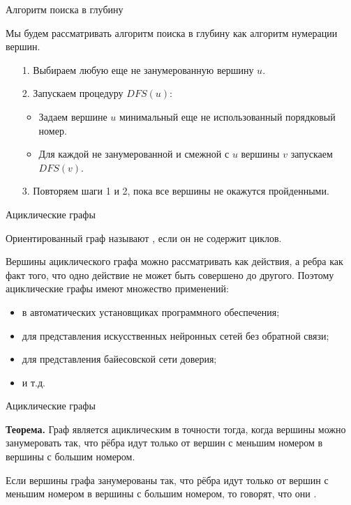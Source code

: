 \begin{frame}{Алгоритм поиска в глубину}

Мы будем рассматривать алгоритм поиска в глубину как алгоритм нумерации вершин.

\begin{itemize}
\item[1.] Выбираем любую еще не занумерованную вершину $u$.
\item[2.] Запускаем процедуру $DFS(u)$:
\begin{itemize}
\item Задаем вершине $u$ минимальный еще не использованный порядковый номер.
\item Для каждой не занумерованной и смежной с $u$ вершины $v$ запускаем $DFS(v)$.
\end{itemize}

\item[3.] Повторяем шаги 1 и 2, пока все вершины не окажутся пройденными.
\end{itemize}
 
\end{frame}





\begin{frame}{Ациклические графы}

 Ориентированный граф называют , если он не содержит циклов.
\spc

Вершины ациклического графа можно рассматривать как действия, а ребра как факт того, что одно действие не может быть совершено до другого.
Поэтому ациклические графы имеют множество применений:

\begin{itemize}
\item в автоматических установщиках программного обеспечения;
\item для представления искусственных нейронных сетей без обратной связи;
\item для представления байесовской сети доверия;
\item и т.д.
\end{itemize}

\end{frame}


\begin{frame}{Ациклические графы}


\spc
{\bf Теорема.} Граф является ациклическим в точности тогда, когда вершины можно занумеровать так, что рёбра идут только от вершин с меньшим номером в вершины с большим номером.

\spc
{} Если вершины графа занумерованы так, что рёбра идут только от вершин с меньшим номером в вершины с большим номером, то говорят, что они .

\end{frame}

